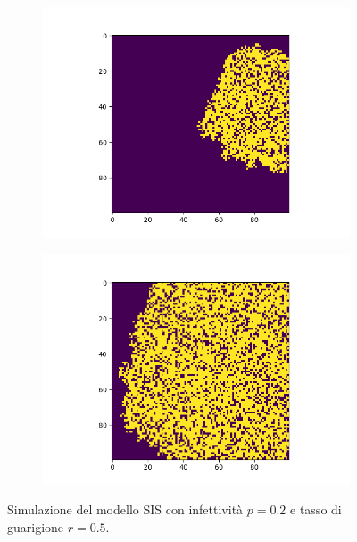 \documentclass{article}
\begin{document}
    \begin{figure}[H]
        \centering
        \begin{subfigure}[b]{0.49\linewidth}
         \centering
         \includegraphics[width=\linewidth]{../images/sis_image1}
     \end{subfigure}
        \hfill
        \begin{subfigure}[b]{0.49\linewidth}
         \centering
         \includegraphics[width=\linewidth]{../images/sis_image2}
     \end{subfigure}
     \caption{Simulazione del modello SIS con infettività $p=0.2$ e tasso di guarigione $r=0.5$.}
     \label{fig:sis_image}
    \end{figure}
\end{document}
